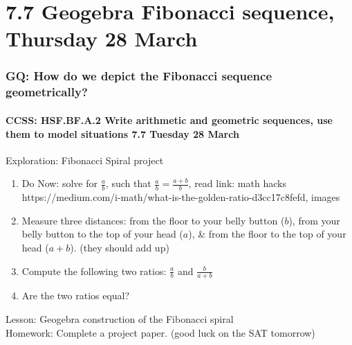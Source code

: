 \documentclass{beamer}
\begin{document}
  \section{7.7 Geogebra Fibonacci sequence, Thursday 28 March}
    \frame
    {
      \frametitle{GQ: How do we depict the Fibonacci sequence geometrically?}
      \framesubtitle{CCSS: HSF.BF.A.2 Write arithmetic and geometric sequences, use them to model situations \hfill \alert{7.7 Tuesday 28 March}}

      \begin{block}{Exploration: Fibonacci Spiral project}
        \begin{enumerate}
          \item Do Now: solve for $\frac{a}{b}$, such that $\frac{a}{b} = \frac{a+b}{b}$, read link: math hacks {https://medium.com/i-math/what-is-the-golden-ratio-d3cc17c8fefd}, images
          \item Measure three distances:  from the floor to your belly button ($b$), from your belly button to the top of your head ($a$), \& from the floor to the top of your head ($a+b$). (they should add up)
          \item Compute the following two ratios: $\frac{a}{b}$ and $\frac{b}{a+b}$
          \item Are the two ratios equal?
      \end{enumerate}
      \end{block}
      Lesson: Geogebra construction of the Fibonacci spiral \\
      Homework: Complete a project paper. (good luck on the SAT tomorrow)
    }
\end{document}
